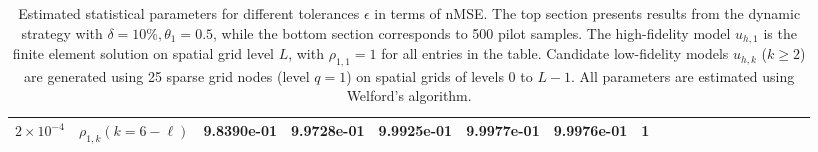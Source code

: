 \begin{table}[ht]
{\begin{tabular}{|c|c|c|c|c|c|c|c|c|c|c|c|c|c|c|c|c|c|c|}
\multirow{1}{*}{$2\times 10^{-4}$}&\multicolumn{1}{|c|}{$\rho_{1,k} (k=6-\ell)$}&9.8390e-01   &9.9728e-01   &9.9925e-01   &9.9977e-01   &9.9976e-01   &1\\
\hline
\end{tabular}}
\caption{Estimated statistical parameters for different tolerances $\epsilon$ in terms of nMSE. The top section presents results from the dynamic strategy with $\delta=10\%, \theta_1=0.5$, while the bottom section corresponds to 500 pilot samples. The high-fidelity model $\widehat u_{h,1}$ is the finite element solution on spatial grid level $L$, with $\rho_{1,1}=1$ for all entries in the table. Candidate low-fidelity models $\widehat u_{h,k}$ ($k \geq 2$) are generated using 25 sparse grid nodes (level $q=1$) on spatial grids of levels 0 to $L-1$. All parameters are estimated using Welford's algorithm.}
\label{Tab:MFMC_parameters}
\end{table}
%






